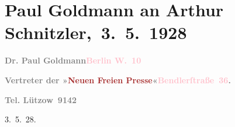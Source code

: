

\renewcommand{\erwaehntePersonen}{Personen: Eva Marie Goldmann, Franziska Goldmann}
\renewcommand{\erwaehnteInstitutionen}{Institutionen: Neue Freie Presse, S. Fischer Verlag}
\renewcommand{\erwaehnteOrte}{Orte: Bendlerstraße, Berlin, Wien}
\renewcommand{\erwaehnteWerke}{Werke: Therese. Chronik eines Frauenlebens}
\section[ Paul Goldmann an Arthur Schnitzler, 3. 5. 1928]{Paul Goldmann an Arthur Schnitzler, 3. 5. 1928}
\nopagebreak{}
\rehead{ }\normalsize\beginnumbering{}
\toendnotes[C]{\smallbreak\pagebreak[2]}
\toendnotes[C]{\smallbreak}
\pstart
           \noindent{}{\pb}\textcolor{gray}{\textbf{Dr. Paul Goldmann}}\hfill \textcolor{gray}{\textbf{\textcolor{pink}{Berlin W. 10}{}\ledrightnote{\textcolor{pink}{Berlin}}}}\pend
           
\pstart
           \textcolor{gray}{\textbf{Vertreter der »\textcolor{brown}{Neuen Freien
                           Presse}{}\ledrightnote{\textcolor{brown}{Neue Freie Presse}}«}}\hfill \textcolor{gray}{\textbf{\textcolor{pink}{Bendlerſtraße 36}{}\ledrightnote{\textcolor{pink}{Bendlerstraße}}.}}\pend
           
\pstart
           \raggedleft{}\textcolor{gray}{\textbf{Tel. Lützow 9142}}\pend
           
\pstart
           \raggedleft{}3. 5. 28.\pend
           
